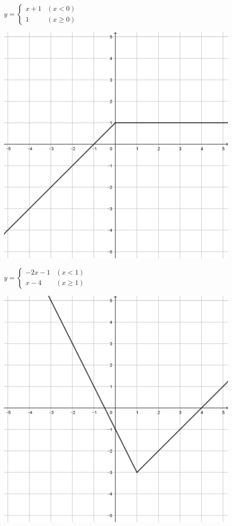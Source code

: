 \documentclass[a4paper]{oblivoir}
\begin{document}
\begin{minipage}{0.45\textwidth}\centering
\(y=\begin{cases}x+1&(x<0)\\1&(x\ge0)\end{cases}\)
\par\bigskip\includegraphics[width=0.9\textwidth]{img/3_piecewise_3}
\end{minipage}
\begin{minipage}{0.45\textwidth}\centering
\(y=\begin{cases}-2x-1&(x<1)\\x-4&(x\ge1)\end{cases}\)
\par\bigskip\includegraphics[width=0.9\textwidth]{img/3_piecewise_4}
\end{minipage}\bigskip\bigskip\par
\end{document}
